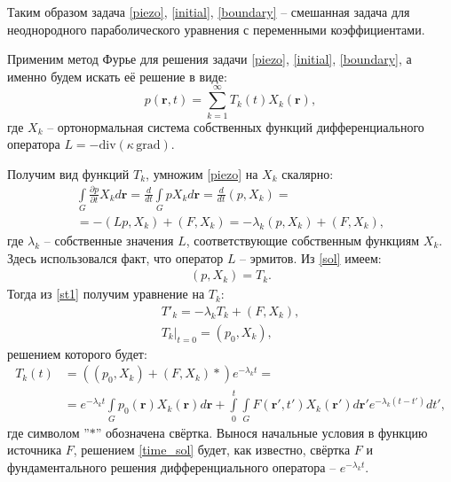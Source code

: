 	Таким образом задача \eqref{piezo}, \eqref{initial}, \eqref{boundary} -- смешанная задача для неоднородного параболического уравнения с переменными коэффициентами.
	
	Применим метод Фурье для решения задачи \eqref{piezo}, \eqref{initial}, \eqref{boundary}, а именно будем искать её решение в виде:
\begin{equation}
	\label{sol}
	p(\boldsymbol{r},t) = \sum_{k=1}^\infty T_k(t)X_k(\boldsymbol{r}),
\end{equation}
	где $X_k$ -- ортонормальная система собственных функций дифференциального оператора $L = -\text{div}\left(\kappa\,\text{grad}\right)$.
		
	Получим вид функций $T_k$, умножим \eqref{piezo} на $X_k$ скалярно:
\begin{align}
	\label{st1}
	\int\limits_G \frac{\partial{p}}{\partial{t}} X_k d\boldsymbol{r} = \frac{d}{dt}\int\limits_G p X_k d\boldsymbol{r} =
	\frac{d}{dt}\left(p, X_k\right) = \nonumber\\
	=-\left(Lp, X_k\right) + \left(F, X_k\right) = -\lambda_k\left(p, X_k\right) + \left(F, X_k\right),
\end{align}
	где $\lambda_k$ -- собственные значения $L$, соответствующие собственным функциям $X_k$. Здесь использовался факт, что оператор $L$ -- эрмитов. Из \eqref{sol} имеем:
\begin{align}
	\label{state2}
	\left(p, X_k\right) = T_k.
\end{align}	
	Тогда из \ref{st1} получим уравнение на $T_k$:
\begin{align}
	\label{time_eq}
	T'_k = -\lambda_k T_k + \left(F, X_k\right), \\
	\left.T_k\right|_{t=0}=\left(p_0, X_k \right),
\end{align}
	решением которого будет:
\begin{align}
	\label{time_sol}
	T_k(t) &= \left(\left(p_0, X_k\right) + \left(F, X_k\right) \ast \right)e^{-\lambda_k t} =\\
	&= e^{-\lambda_k t}\int\limits_G p_0(\boldsymbol{r})X_k(\boldsymbol{r})d\boldsymbol{r}+
	\int\limits_0^t\int\limits_G F(\boldsymbol{r}', t') X_k(\boldsymbol{r}')d\boldsymbol{r}' e^{-\lambda_k (t-t')}dt',\nonumber
\end{align}
	где символом ''$\ast$'' обозначена свёртка. Вынося начальные условия в функцию источника $F$, решением \eqref{time_sol} будет, как известно, свёртка $F$ и фундаментального решения дифференциального оператора -- $e^{-\lambda_k t}$.

